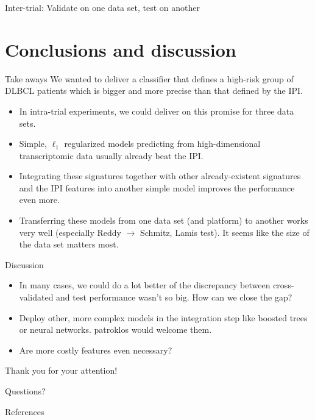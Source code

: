 \documentclass[10pt, aspectratio=169]{beamer}
\begin{document}
\begin{frame}{Inter-trial: Validate on one data set, test on another}
  
\end{frame}

\section{Conclusions and discussion}
\begin{frame}{Take aways}
  We wanted to deliver a classifier that defines a high-risk group of DLBCL 
  patients which is bigger and more precise than that defined by the IPI.
  \begin{itemize}
    \item In intra-trial experiments, we could deliver on this promise for three 
      data sets.
    \pause
    \item Simple, $\ell_1$ regularized models predicting from high-dimensional 
      transcriptomic data usually already beat the IPI.
    \pause
    \item Integrating these signatures together with other already-existent 
      signatures and the IPI features into another simple model improves the 
      performance even more.
    \pause
    \item Transferring these models from one data set (and platform) to another
      works very well (especially Reddy $\to$ Schmitz, Lamis test). It seems like 
      the size of the data set matters most.
  \end{itemize}
\end{frame}

\begin{frame}{Discussion}
  \begin{itemize}
    \item In many cases, we could do a lot better of the discrepancy between 
      cross-validated and test performance wasn't so big. How can we close the 
      gap?
    \item Deploy other, more complex models in the integration step like boosted 
      trees or neural networks. patroklos would welcome them.
    \item Are more costly features even necessary?
  \end{itemize}
\end{frame}

\begin{frame}[standout]
  Thank you for your attention! \par Questions?
\end{frame}

\appendix

\begin{frame}[allowframebreaks]{References}
  
\end{frame}
\end{document}
